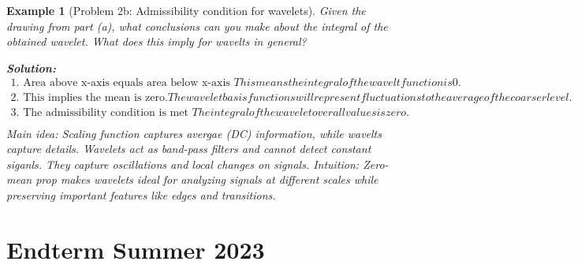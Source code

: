 \documentclass[11pt,a4paper]{article}
\newtheorem{example}[theorem]{Example}
\begin{document}
\begin{example}[Problem 2b: Admissibility condition for wavelets]
    Given the drawing from part (a), what conclusions can you make about the integral of the obtained wavelet. What does this imply for wavelts in general?
    
    \textbf{Solution:}
    \begin{align}
        \text{1. Area above x-axis equals area below x-axis } This means the integral of the wavelt function is 0. \\
        \text{2. This implies the mean is zero.} The wavelet basis functions will represent fluctuations to the average of the coarser level. \\
        \text{3. The admissibility condition is met } The integral of the wavelet over all values is zero. \\
    \end{align}
    Main idea: Scaling function captures avergae (DC) information, while wavelts capture details. Wavelets act as band-pass filters and cannot detect constant siganls. They capture oscillations and local changes on signals.
    Intuition: Zero-mean prop makes wavelets ideal for analyzing signals at different scales while preserving important features like edges and transitions.

\end{example}

\section{Endterm Summer 2023}
\end{document}
